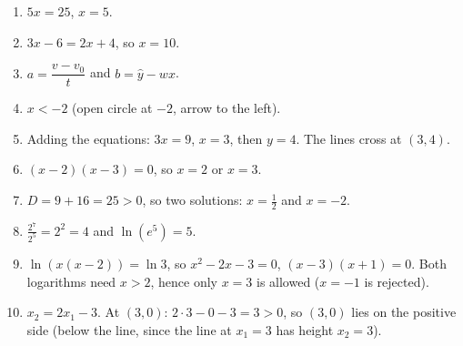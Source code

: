 \begin{enumerate}[label=\textbf{\ansnum.\arabic*}]
  \item $5x=25$, $x=5$.
  \item $3x-6=2x+4$, so $x=10$.
  \item $a=\dfrac{v-v_0}{t}$ and $b=\hat y-wx$.
  \item $x<-2$ (open circle at $-2$, arrow to the left).
  \item Adding the equations: $3x=9$, $x=3$, then $y=4$. The lines cross at $(3,4)$.
  \item $(x-2)(x-3)=0$, so $x=2$ or $x=3$.
  \item $D=9+16=25>0$, so two solutions: $x=\frac12$ and $x=-2$.
  \item $\frac{2^7}{2^5}=2^2=4$ and $\ln(e^5)=5$.
  \item $\ln(x(x-2))=\ln3$, so $x^2-2x-3=0$, $(x-3)(x+1)=0$. Both logarithms need $x>2$, hence only $x=3$ is allowed ($x=-1$ is rejected).
  \item $x_2=2x_1-3$. At $(3,0)$: $2\cdot3-0-3=3>0$, so $(3,0)$ lies on the positive side (below the line, since the line at $x_1=3$ has height $x_2=3$).
\end{enumerate}
